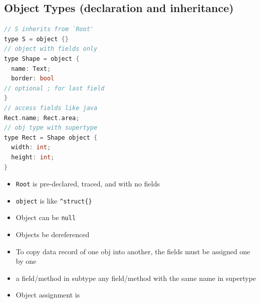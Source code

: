 \documentclass[10pt,a4paper,landscape]{article}
\begin{document}
\pagestyle{empty}

\begin{multicols*}{3}

\section*{Object Types (declaration and inheritance)}
\begin{minipage}{.5\linewidth}
\begin{lstlisting}[language=c]
// S inherits from `Root'
type S = object {}
// object with fields only
type Shape = object {
  name: Text;
  border: bool
// optional ; for last field
}
// access fields like java
Rect.name; Rect.area;
// obj type with supertype
type Rect = Shape object {
  width: int;
  height: int;
}
\end{lstlisting}
\end{minipage}
\begin{minipage}{.5\linewidth}
  \flushleft
  \begin{itemize}
  \item \texttt{Root} is pre-declared, traced, and with no fields
  \item \texttt{object} is like \verb|^struct{}|
  \item Object can be \texttt{null}
  \item Objects  be dereferenced
  \item To copy data record of one obj into another, the fields must be assigned one by one
  \item a field/method in subtype  any field/method with the same name in supertype
  \item Object assignment is 
  \end{itemize}
\end{minipage}


\end{multicols*}
\end{document}
